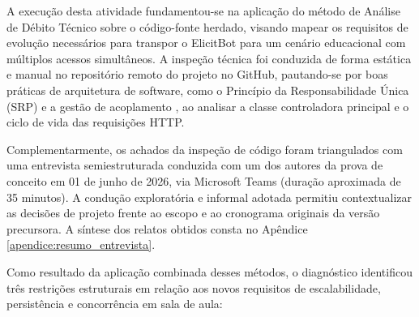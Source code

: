 A execução desta atividade fundamentou-se na aplicação do método de Análise de Débito Técnico sobre o código-fonte herdado, visando mapear os requisitos de evolução necessários para transpor o ElicitBot para um cenário educacional com múltiplos acessos simultâneos. A inspeção técnica foi conduzida de forma estática e manual no repositório remoto do projeto no GitHub, pautando-se por boas práticas de arquitetura de software, como o Princípio da Responsabilidade Única (SRP) \cite{martin2018} e a gestão de acoplamento \cite{pressman2021}, ao analisar a classe controladora principal e o ciclo de vida das requisições HTTP.

Complementarmente, os achados da inspeção de código foram triangulados com uma entrevista semiestruturada conduzida com um dos autores da prova de conceito em 01 de junho de 2026, via Microsoft Teams (duração aproximada de 35 minutos). A condução exploratória e informal adotada permitiu contextualizar as decisões de projeto frente ao escopo e ao cronograma originais da versão precursora. A síntese dos relatos obtidos consta no Apêndice \ref{apendice:resumo_entrevista}.

Como resultado da aplicação combinada desses métodos, o diagnóstico identificou três restrições estruturais em relação aos novos requisitos de escalabilidade, persistência e concorrência em sala de aula:


